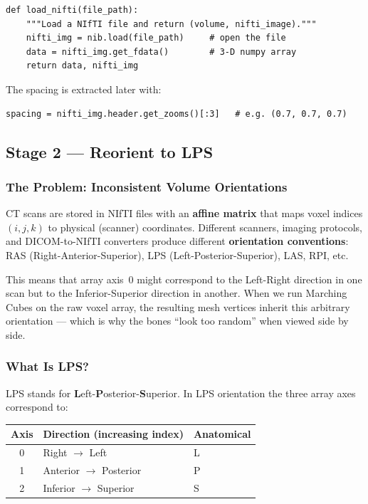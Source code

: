 \documentclass[12pt,a4paper]{article}
\begin{document}
\begin{lstlisting}
def load_nifti(file_path):
    """Load a NIfTI file and return (volume, nifti_image)."""
    nifti_img = nib.load(file_path)     # open the file
    data = nifti_img.get_fdata()        # 3-D numpy array
    return data, nifti_img
\end{lstlisting}

The spacing is extracted later with:

\begin{lstlisting}
spacing = nifti_img.header.get_zooms()[:3]   # e.g. (0.7, 0.7, 0.7)
\end{lstlisting}


\subsection{Stage 2 — Reorient to LPS}
\label{sec:lps}

\subsubsection{The Problem: Inconsistent Volume Orientations}

CT scans are stored in NIfTI files with an \textbf{affine matrix} that maps
voxel indices $(i,j,k)$ to physical (scanner) coordinates.  Different scanners,
imaging protocols, and DICOM-to-NIfTI converters produce different
\textbf{orientation conventions}: RAS (Right-Anterior-Superior), LPS
(Left-Posterior-Superior), LAS, RPI, etc.

This means that array axis~0 might correspond to the Left-Right direction in
one scan but to the Inferior-Superior direction in another.  When we run
Marching Cubes on the raw voxel array, the resulting mesh vertices inherit this
arbitrary orientation — which is why the bones ``look too random'' when viewed
side by side.

\subsubsection{What Is LPS?}

LPS stands for \textbf{L}eft-\textbf{P}osterior-\textbf{S}uperior.  In LPS
orientation the three array axes correspond to:

\begin{center}
\begin{tabular}{cll}
    \toprule
    \textbf{Axis} & \textbf{Direction (increasing index)} & \textbf{Anatomical} \\
    \midrule
    0 & Right $\to$ Left       & L \\
    1 & Anterior $\to$ Posterior & P \\
    2 & Inferior $\to$ Superior  & S \\
    \bottomrule
\end{tabular}
\end{center}
\end{document}
